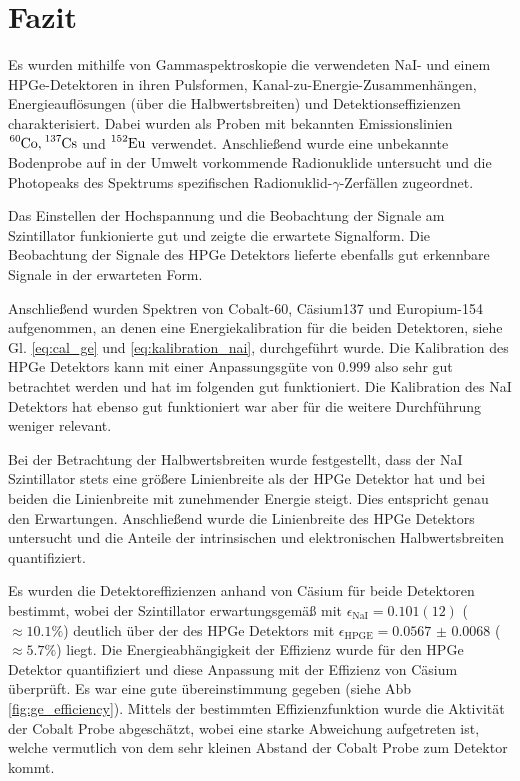 \chapter{Fazit}

Es wurden mithilfe von Gammaspektroskopie die verwendeten NaI- und einem HPGe-Detektoren in ihren Pulsformen, Kanal-zu-Energie-Zusammenhängen, Energieauflösungen (über die Halbwertsbreiten) und Detektionseffizienzen charakterisiert. Dabei wurden als Proben mit bekannten Emissionslinien $\ce{^60Co}, \ce{^137Cs}$ und $\ce{^152Eu}$ verwendet. Anschließend wurde eine unbekannte Bodenprobe auf in der Umwelt vorkommende Radionuklide untersucht und die Photopeaks des Spektrums spezifischen Radionuklid-$\gamma$-Zerfällen zugeordnet.

Das Einstellen der Hochspannung und die Beobachtung der Signale am Szintillator funkionierte gut und zeigte die erwartete Signalform. Die Beobachtung der Signale des HPGe Detektors lieferte ebenfalls gut erkennbare Signale in der erwarteten Form.

Anschließend wurden Spektren von Cobalt-60, Cäsium137 und Europium-154 aufgenommen, an denen eine Energiekalibration für die beiden Detektoren, siehe Gl. \ref{eq:cal_ge} und \ref{eq:kalibration_nai}, durchgeführt wurde. Die Kalibration des HPGe Detektors kann mit einer Anpassungsgüte von $0.999$ also sehr gut betrachtet werden und hat im folgenden gut funktioniert. Die Kalibration des NaI Detektors hat ebenso gut funktioniert war aber für die weitere Durchführung weniger relevant.

Bei der Betrachtung der Halbwertsbreiten wurde festgestellt, dass der NaI Szintillator stets eine größere Linienbreite als der HPGe Detektor hat und bei beiden die Linienbreite mit zunehmender Energie steigt. Dies entspricht genau den Erwartungen. Anschließend wurde die Linienbreite des HPGe Detektors untersucht und die Anteile der intrinsischen und elektronischen Halbwertsbreiten quantifiziert.

Es wurden die Detektoreffizienzen anhand von Cäsium für beide Detektoren bestimmt, wobei der Szintillator erwartungsgemäß mit $\epsilon_\text{NaI} = 0.101(12)$ ($\approx 10.1\%$) deutlich über der des HPGe Detektors mit $\epsilon_\text{HPGE} = \num{0.0567(68)}$ ($\approx 5.7\%$) liegt.
Die Energieabhängigkeit der Effizienz wurde für den HPGe Detektor quantifiziert und diese Anpassung mit der Effizienz von Cäsium überprüft. Es war eine gute übereinstimmung gegeben (siehe Abb \ref{fig:ge_efficiency}).
Mittels der bestimmten Effizienzfunktion wurde die Aktivität der Cobalt Probe abgeschätzt, wobei eine starke Abweichung aufgetreten ist, welche vermutlich von dem sehr kleinen Abstand der Cobalt Probe zum Detektor kommt.


